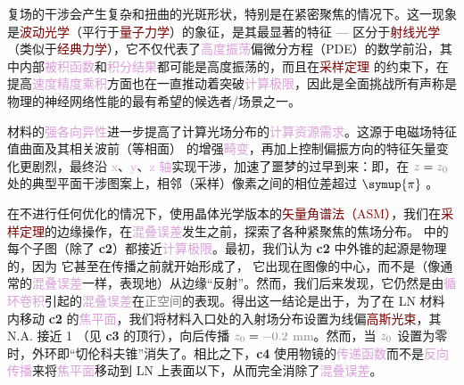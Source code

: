 复场的\textcolor{PineGreen}{干涉}会产生复杂和扭曲的光斑形状，特别是在\textcolor{PineGreen}{紧密聚焦}的情况下。这一现象是\textcolor{Maroon}{波动光学}（平行于\textcolor{Maroon}{量子力学}）的象征，是其最显著的特征 --- 区分于\textcolor{Maroon}{射线光学}（类似于\textcolor{Maroon}{经典力学}），它不仅代表了\textcolor{Plum}{高度振荡}偏微分方程（PDE）的数学前沿，其中内部\textcolor{Plum}{被积函数}和\textcolor{Plum}{积分结果}都可能是高度振荡的\cite{agocsAdaptiveSpectralMethod2024}，而且在\textcolor{Maroon}{采样定理}\cite{wangTheoryAlgorithmHomeomorphic2020} 的约束下，在提高\textcolor{Plum}{速度精度乘积}方面也在一直推动着突破\textcolor{Plum}{计算极限}，因此是全面挑战所有声称是物理的神经网络性能的最有希望的候选者/场景之一\cite{wrightDeepPhysicalNeural2022}。

材料的\textcolor{Plum}{强各向异性}进一步提高了计算光场分布的\textcolor{Plum}{计算资源需求}。这源于电磁场\textcolor{PineGreen}{特征值曲面}及其相关\textcolor{NavyBlue}{波前（等相面）} 的增强\textcolor{Plum}{畸变}，再加上控制偏振方向的\textcolor{PineGreen}{特征矢量}变化更剧烈，最终沿 \textcolor{Plum}{x}、\textcolor{Plum}{y}、\textcolor{Plum}{z 轴}实现\textcolor{PineGreen}{干涉}，加速了噩梦的过早到来：即，在 $\mathcolor{gray}{z}=\mathcolor{gray}{z_0}$ 处的典型平面\textcolor{PineGreen}{干涉}图案上，相邻（采样）像素之间的\textcolor{NavyBlue}{相位差}超过 $\symup{\pi}$ \cite{leuteneggerFastFocusField2006,heintzmannScalableAngularSpectrum2023}。

在不进行任何优化的情况下，使用\textcolor{PineGreen}{晶体光学}版本的\textcolor{Maroon}{矢量角谱法（ASM）}，我们在\textcolor{Maroon}{采样定理}的边缘操作，在\textcolor{Plum}{混叠误差}发生之前，探索了各种\textcolor{PineGreen}{紧聚焦}的焦场分布。 中的每个子图（除了 \textbf{c2}）都接近\textcolor{Plum}{计算极限}。最初，我们认为 \textbf{c2} 中\textcolor{NavyBlue}{外锥}的起源是\textcolor{NavyBlue}{物理的}，因为 {\one} 它甚至在传播之前就开始形成了，{\two} 它出现在图像的中心，而不是（像通常的\textcolor{Plum}{混叠误差}一样，表现地）从边缘“\textcolor{PineGreen}{反射}”。然而，我们后来发现，它仍然是由\textcolor{Plum}{循环卷积}引起的\textcolor{Plum}{混叠误差}在\textcolor{gray}{正空间}的表现。得出这一结论是出于，为了在 LN 材料内移动 \textbf{c2} 的\textcolor{Plum}{焦平面}，我们将材料入口处的入射场分布设置为\textcolor{PineGreen}{线偏}\textcolor{Maroon}{高斯光束}，其 N.A. 接近 1 （见 \textbf{c3} 的顶行），向后传播 $\mathcolor{gray}{z_0}=\mathcolor{gray}{-0.2}$ \textcolor{gray}{mm}。然而，当 $\mathcolor{gray}{z_0}$ 设置为零时，\textcolor{NavyBlue}{外环}即“\textcolor{NavyBlue}{切伦科夫锥}”消失了。相比之下，\textbf{c4} 使用\textcolor{PineGreen}{物镜}的\textcolor{Plum}{传递函数}而不是\textcolor{Plum}{反向传播}来将\textcolor{Plum}{焦平面}移动到 LN 上表面以下，从而完全消除了\textcolor{Plum}{混叠误差}。

